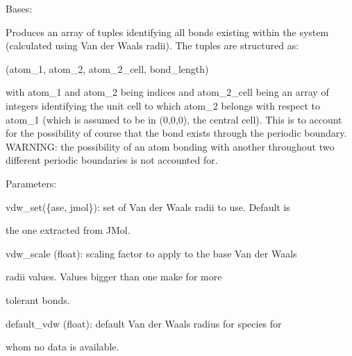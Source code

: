 \documentclass[letterpaper,10pt,english]{sphinxmanual}
\begin{document}
\begin{fulllineitems}
\label{doctree/soprano.properties.linkage.linkage:soprano.properties.linkage.linkage.Bonds}
Bases: {\hyperref[doctree/soprano.properties.atomsproperty:soprano.properties.atomsproperty.AtomsProperty]{\emph{}}}

Produces an array of tuples identifying all bonds existing within the 
system (calculated using Van der Waals radii). The tuples are structured
as:

(atom\_1, atom\_2, atom\_2\_cell, bond\_length)

with atom\_1 and atom\_2 being indices and atom\_2\_cell being an array of
integers identifying the unit cell to which atom\_2 belongs with respect
to atom\_1 (which is assumed to be in (0,0,0), the central cell). This is
to account for the possibility of course that the bond exists through the
periodic boundary. WARNING: the possibility of an atom bonding with
another throughout two different periodic boundaries is not accounted for.

\begin{DUlineblock}{0em}
\item[] Parameters:
\item[]
\begin{DUlineblock}{\DUlineblockindent}
\item[] vdw\_set(\{ase, jmol\}): set of Van der Waals radii to use. Default is
\item[]
\begin{DUlineblock}{\DUlineblockindent}
\item[] the one extracted from JMol.
\end{DUlineblock}
\item[] vdw\_scale (float): scaling factor to apply to the base Van der Waals
\item[]
\begin{DUlineblock}{\DUlineblockindent}
\item[] radii values. Values bigger than one make for more
\item[] tolerant bonds.
\end{DUlineblock}
\item[] default\_vdw (float): default Van der Waals radius for species for
\item[]
\begin{DUlineblock}{\DUlineblockindent}
\item[] whom no data is available.
\end{DUlineblock}
\end{DUlineblock}
\end{DUlineblock}


\end{fulllineitems}
\end{document}
